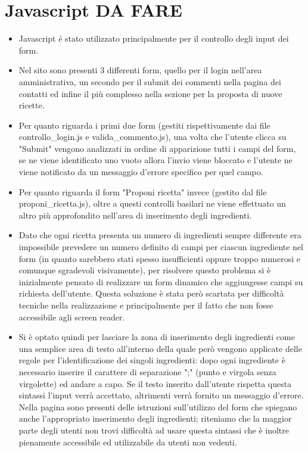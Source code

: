 \documentclass[12pt]{article}
\begin{document}
			\section{Javascript DA FARE}
			\begin{itemize}
				

				\item Javascript \'e stato utilizzato principalmente per il controllo degli input dei form. 
				\item Nel sito sono presenti 3 differenti form, quello per il login nell'area amministrativa, un secondo per il submit dei commenti nella pagina dei contatti ed infine il pi\`u complesso nella sezione per la proposta di nuove ricette. 
				\item Per quanto riguarda i primi due form (gestiti rispettivamente dai file controllo\_login.js e valida\_commento.js), una volta che l'utente clicca su "Submit" vengono analizzati in ordine di apparizione tutti i campi del form, se ne viene identificato uno vuoto allora l'invio viene bloccato e l'utente ne viene notificato da un messaggio d'errore specifico per quel campo.
				\item Per quanto riguarda il form "Proponi ricetta" invece (gestito dal file proponi\_ricetta.js), oltre a questi controlli basilari ne viene effettuato un altro pi\`u approfondito nell'area di inserimento degli ingredienti. 
				\item Dato che ogni ricetta presenta un numero di ingredienti sempre differente era impossibile prevedere un numero definito di campi per ciascun ingrediente nel form (in quanto sarebbero stati spesso insufficienti oppure troppo numerosi e comunque sgradevoli visivamente), per risolvere questo problema si \`e inizialmente pensato di realizzare un form dinamico che aggiungesse campi su richiesta dell'utente. Questa soluzione \`e stata però scartata per difficolt\`a tecniche nella realizzazione e principalmente per il fatto che non fosse accessibile agli screen reader. 
				\item Si \`e optato quindi per lasciare la zona di inserimento degli ingredienti come una semplice area di testo all'interno della quale per\`o vengono applicate delle regole per l'identificazione dei singoli ingredienti: dopo ogni ingrediente \`e necessario inserire il carattere di separazione ";" (punto e virgola senza virgolette) ed andare a capo. Se il testo inserito dall'utente rispetta questa sintassi l'input verr\`a accettato, altrimenti verr\`a fornito un messaggio d'errore. Nella pagina sono presenti delle istruzioni sull'utilizzo del form che spiegano anche l'appropriato inserimento degli ingredienti; riteniamo che la maggior parte degli utenti non trovi difficolt\`a ad usare questa sintassi che \`e inoltre pienamente accessibile ed utilizzabile da utenti non vedenti.		
		
			\end{itemize}
	\newpage
\end{document}
